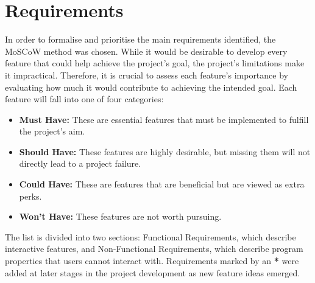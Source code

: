 \documentclass{l4proj}
\begin{document}
\section{Requirements}
In order to formalise and prioritise the main requirements identified, the MoSCoW method \citep{clegg1994moscow} was chosen. While it would be desirable to develop every feature that could help achieve the project's goal, the project's limitations make it impractical. Therefore, it is crucial to assess each feature's importance by evaluating how much it would contribute to achieving the intended goal. Each feature will fall into one of four categories:

\begin{itemize}
    \item \textbf{Must Have:} These are essential features that must be implemented to fulfill the project's aim.
    \item \textbf{Should Have:} These features are highly desirable, but missing them will not directly lead to a project failure.
    \item \textbf{Could Have:} These are features that are beneficial but are viewed as extra perks.
    \item \textbf{Won't Have:} These features are not worth pursuing.
\end{itemize}

The list is divided into two sections: Functional Requirements, which describe interactive features, and Non-Functional Requirements, which describe program properties that users cannot interact with. Requirements marked by an \textbf{*} were added at later stages in the project development as new feature ideas emerged.
\end{document}
